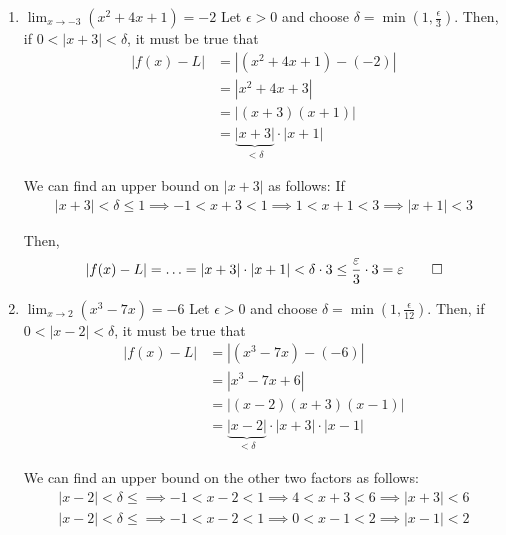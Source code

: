 \documentclass{article}
\begin{document}
\begin{enumerate}
  \item $\lim_{x \to -3} \left(x^2+4x+1\right) = -2$
  \newline\color{blue}
  Let $\epsilon>0$ and choose $\delta = \min\left({1, \frac{\epsilon}{3}}\right)$.
  Then, if $0 < \left| x + 3 \right| < \delta$, it must be true that
  \begin{align*}
    \left| f(x) - L \right| &= \left| (x^2 + 4x + 1) - (-2) \right| \\
    &= \left| x^2 + 4x + 3 \right| \\
    &= \left| (x+3)(x+1) \right| \\
    &= \underbrace{\left|x+3\right|}_{< \delta} \cdot \left|x+1\right|
  \end{align*}

  We can find an upper bound on $\left|x+3\right|$ as follows: If 
  \begin{align*}
    \left| x + 3 \right| < \delta \le 1 \implies -1 < x + 3 < 1 \implies 1 < x + 1 < 3 \implies \left| x + 1 \right| < 3
  \end{align*}

  Then, 
  \[
    \left| f(x) - L \right| = \ldots = \left|x+3\right| \cdot \left|x+1\right| 
    < \delta \cdot 3 \leq \frac{\epsilon}{3} \cdot 3 = \epsilon \qed
  \]
  \color{black}
  
  \item $\lim_{x \to 2} \left( x^3 - 7x \right) = -6$
  \newline\color{blue}
  Let $\epsilon>0$ and choose $\delta = \min\left({1, \frac{\epsilon}{12}}\right)$.
  Then, if $0 < \left| x - 2 \right| < \delta$, it must be true that
  \begin{align*}
    \left| f(x) - L \right| &= \left| (x^3 - 7x) - (-6) \right| \\
    &= \left| x^3 - 7x + 6 \right| \\
    &= \left| (x-2)(x+3)(x-1) \right| \\
    &= \underbrace{\left|x-2\right|}_{< \delta} \cdot \left|x+3\right| \cdot \left|x-1\right|
  \end{align*}

  We can find an upper bound on the other two factors as follows: 
  \begin{align*}
    \left| x - 2 \right| < \delta \le \implies -1 < x - 2 < 1 \implies 4 < x + 3 < 6 \implies \left|x+3\right| < 6 \\
    \left| x - 2 \right| < \delta \le \implies -1 < x - 2 < 1 \implies 0 < x - 1 < 2 \implies \left|x-1\right| < 2
  \end{align*}


\end{enumerate}
\end{document}

